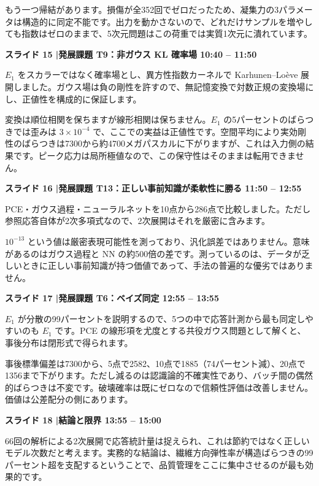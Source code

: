 \documentclass[11pt,a4paper]{ltjsarticle}
\newcommand{\slide}[3]{%
  \medskip
  \noindent\colorbox{luhblue}{\parbox{\dimexpr\linewidth-2\fboxsep}{%
    \color{white}\bfseries\small スライド #1 \quad|\quad #2 \hfill #3}}\par
  \nopagebreak\vspace{0.25em}}
\begin{document}
もう一つ帰結があります。損傷が全352回でゼロだったため、凝集力の3パラメータは構造的に同定不能です。出力を動かさないので、どれだけサンプルを増やしても指数はゼロのままで、5次元問題はこの荷重では実質1次元に潰れています。

\slide{15}{発展課題 T9：非ガウス KL 確率場}{10:40 -- 11:50}

$E_1$ をスカラーではなく確率場とし、異方性指数カーネルで Karhunen--Lo\`{e}ve 展開しました。ガウス場は負の剛性を許すので、無記憶変換で対数正規の変換場にし、正値性を構成的に保証します。

変換は順位相関を保ちますが線形相関は保ちません。$E_1$ の5パーセントのばらつきでは歪みは $3\times10^{-4}$ で、ここでの実益は正値性です。空間平均により実効剛性のばらつきは7300から約4700メガパスカルに下がりますが、これは入力側の結果です。ピーク応力は局所極値なので、この保守性はそのままは転用できません。

\slide{16}{発展課題 T13：正しい事前知識が柔軟性に勝る}{11:50 -- 12:55}

PCE・ガウス過程・ニューラルネットを10点から286点で比較しました。ただし参照応答自体が2次多項式なので、2次展開はそれを厳密に含みます。

$10^{-13}$ という値は厳密表現可能性を測っており、汎化誤差ではありません。意味があるのはガウス過程と NN の約500倍の差です。測っているのは、データが乏しいときに正しい事前知識が持つ価値であって、手法の普遍的な優劣ではありません。

\slide{17}{発展課題 T6：ベイズ同定}{12:55 -- 13:55}

$E_1$ が分散の99パーセントを説明するので、5つの中で応答計測から最も同定しやすいのも $E_1$ です。PCE の線形項を尤度とする共役ガウス問題として解くと、事後分布は閉形式で得られます。

事後標準偏差は7300から、5点で2582、10点で1885（74パーセント減）、20点で1356まで下がります。ただし減るのは認識論的不確実性であり、バッチ間の偶然的ばらつきは不変です。破壊確率は既にゼロなので信頼性評価は改善しません。価値は公差配分の側にあります。

\slide{18}{結論と限界}{13:55 -- 15:00}

66回の解析による2次展開で応答統計量は捉えられ、これは節約ではなく正しいモデル次数だと考えます。実務的な結論は、繊維方向弾性率が構造ばらつきの99パーセント超を支配するということで、品質管理をここに集中させるのが最も効果的です。
\end{document}
